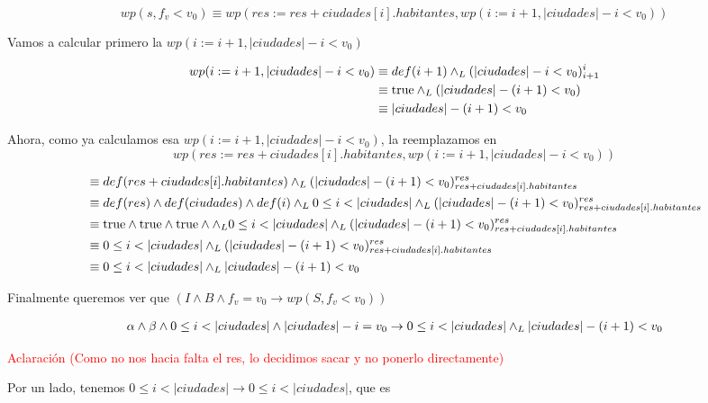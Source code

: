 \documentclass[10pt,a4paper]{article}
\begin{document}
\begin {enumerate}
     $$wp(s, f_{v}<v_{0}) \equiv  wp(res := res + ciudades[i].habitantes, wp(i := i +1, |ciudades| - i < v_{0}))$$

      Vamos a calcular primero la $wp(i := i +1, |ciudades| - i < v_{0}) $

      \begin{align*}
        wp(i := i +1, |ciudades| - i < v_{0}) &\equiv def (i + 1) \land _L (|ciudades| - i < v_{0})_{i + 1}^{i} \\
        &\equiv \mathrm{true} \land _L (|ciudades| - (i + 1) < v_{0}) \\
        &\equiv |ciudades| - (i + 1) < v_{0}
    \end{align*}

    Ahora, como ya calculamos esa $wp(i := i +1, |ciudades| - i < v_{0}) $, la reemplazamos en  \\
    $$ wp(res := res + ciudades[i].habitantes, wp(i := i +1, |ciudades| - i < v_{0}))$$

    \begin{align*}
        &\equiv def (res + ciudades[i].habitantes) \land _L (|ciudades| - (i + 1) < v_{0})_{res + ciudades[i].habitantes}^{res} \\
        &\equiv def(res) \land def(ciudades) \land def(i) \land _L 0 \leq i < |ciudades| \land _L (|ciudades| - (i + 1) < v_{0})_{res + ciudades[i].habitantes}^{res}\\
        &\equiv \mathrm{true} \land \mathrm{true} \land \mathrm{true} \land \land _L 0 \leq i < |ciudades| \land _L (|ciudades| - (i + 1) < v_{0})_{res + ciudades[i].habitantes}^{res}\\
        &\equiv 0 \leq i < |ciudades| \land _L (|ciudades| - (i + 1) < v_{0})_{res + ciudades[i].habitantes}^{res}\\
        &\equiv 0 \leq i < |ciudades| \land _L |ciudades| - (i + 1) < v_{0}
    \end{align*}

    Finalmente queremos ver que $(I \land B \land f_{v} = v_{0} \to wp(S, f_{v} < v_{0}))$

    \begin{align*}
        \alpha \land \beta \land 0 \leq i < |ciudades| \land |ciudades| - i = v_{0} \to 0 \leq i < |ciudades| \land _L |ciudades| - (i + 1) < v_{0}
    \end{align*}

    \textcolor{red}{Aclaración (Como no nos hacia falta el res, lo decidimos sacar y no ponerlo directamente)}

    Por un lado, tenemos $0 \leq i < |ciudades| \to 0 \leq i < |ciudades|$, que es \True


\end{enumerate}
\end{document}
